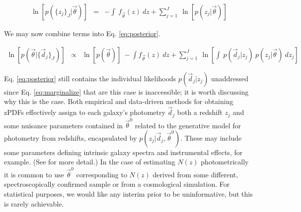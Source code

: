 \documentclass[preprint]{aastex}
\begin{document}
\begin{eqnarray}
\label{eq:indie}
\ln[p(\{z_{j}\}_{J}|\vec{\theta})] &=& -\int\ f_{\vec{\theta}}(z)\ dz +  \sum_{j=1}^{J}\ \ln[p(z_{j}|\vec{\theta})]
\end{eqnarray}


We may now combine terms into Eq. \ref{eq:posterior}.

\begin{eqnarray}
\label{eq:posterior}
\ln[p(\vec{\theta}|\{\vec{d}_{j}\}_{J})] &\propto& \ln[p(\vec{\theta})]\ -\int f_{\vec{\theta}}(z)\ dz + \sum_{j=1}^{J}\ \ln\left[\int\ p(\vec{d}_{j}|z_{j})\ p(z_{j}|\vec{\theta})\ dz_{j}\right]
\end{eqnarray}

Eq. \ref{eq:posterior} still contains the individual likelihoods $p(\vec{d}_{j}|z_{j})$ unaddressed since Eq. \ref{eq:marginalize} that are this case is inaccessible; it is worth discussing why this is the case.  Both empirical and data-driven methods for obtaining zPDFs effectively assign to each galaxy's photometry $\vec{d}_{j}$ both a redshift $z_{j}$ and some nuisance parameters contained in $\vec{\theta}^{0}$ related to the generative model for photometry from redshifts, encapsulated by $p(z_{j}|\vec{d}_{j},\vec{\theta}^{0})$.  These may include some parameters defining intrinsic galaxy spectra and instrumental effects, for example. (See \citet{ben98} for more detail.)  In the case of estimating $N(z)$ photometrically it is common to use $\vec{\theta}^{0}$ corresponding to $N(z)$ derived from some different, spectroscopically confirmed sample or from a cosmological simulation.  For statistical purposes, we would like any interim prior to be uninformative, but this is rarely achievable.

\end{document}
